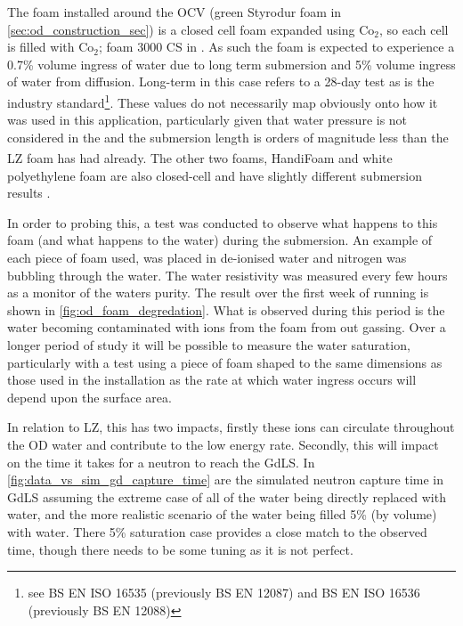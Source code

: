 \par
The foam installed around the OCV (green Styrodur foam in \autoref{sec:od_construction_sec}) is a closed cell foam expanded using Co$_2$, so each cell is filled with Co$_2$; foam 3000 CS in \cite{styrodur_water_ingress_ref}.
As such the foam is expected to experience a 0.7\% volume ingress of water due to long term submersion and 5\% volume ingress of water from diffusion.
Long-term in this case refers to a 28-day test as is the industry standard\footnote{see BS EN ISO 16535 (previously BS EN 12087) and BS EN ISO 16536 (previously BS EN 12088)}.
These values do not necessarily map obviously onto how it was used in this application, particularly given that water pressure is not considered in the and the submersion length is orders of magnitude less than the LZ foam has had already.
The other two foams, HandiFoam\textsuperscript{\textregistered} and white polyethylene foam are also closed-cell and have slightly different submersion results
\cite{handifoam_water_ingress_ref, white_foam_ref}. 
\par
In order to probing this, a test was conducted to observe what happens to this foam (and what happens to the water) during the submersion.
An example of each piece of foam used, was placed in de-ionised water and nitrogen was bubbling through the water. 
The water resistivity was measured every few hours as a monitor of the waters purity.
The result over the first week of running is shown in \autoref{fig:od_foam_degredation}.
What is observed during this period is the water becoming contaminated with ions from the foam from out gassing.
Over a longer period of study it will be possible to measure the water saturation, particularly with a test using a piece of foam shaped to the same dimensions as those used in the installation as the rate at which water ingress occurs will depend upon the surface area.
\par
In relation to LZ, this has two impacts, firstly these ions can circulate throughout the OD water and contribute to the low energy rate.
Secondly, this will impact on the time it takes for a neutron to reach the GdLS.
In \autoref{fig:data_vs_sim_gd_capture_time} are the simulated neutron capture time in GdLS assuming the extreme case of all of the water being directly replaced with water, and the more realistic scenario of the water being filled 5\% (by volume) with water.
There 5\% saturation case provides a close match to the observed time, though there needs to be some tuning as it is not perfect.




